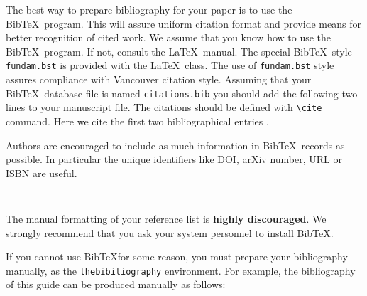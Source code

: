 \documentclass{fundam}
\begin{document}
The best way to prepare bibliography for your paper is to use the
Bib\TeX\ program.  This will assure uniform citation format and provide means for better recognition of cited work. We assume that you know how to use the Bib\TeX\
program.  If not, consult the \LaTeX\ manual. The special Bib\TeX\
style \texttt{fundam.bst} is provided with the \LaTeX\ class. The  use of \texttt{fundam.bst} style assures compliance with Vancouver citation style. Assuming
that your Bib\TeX\ database file is named \texttt{citations.bib} you
should add the following two lines to your manuscript file. The
citations should be defined with \verb|\cite| command. Here we cite
the first two bibliographical entries \cite{RSFDGrC,KrasuskiJSS13}.

Authors are encouraged to include as much information in Bib\TeX\ records as possible. In particular the unique identifiers like DOI, arXiv number, URL or ISBN are useful.


\begin{verbatim}


\end{verbatim}

The manual formatting of your reference list is \textbf{highly discouraged}. We
strongly recommend that you ask your system personnel to install
Bib\TeX.

If you cannot use Bib\TeX for some reason, you must prepare your
bibliography manually, as the \verb!thebibiliography! environment.
For example, the bibliography of this guide can be produced manually
as follows:
\end{document}
